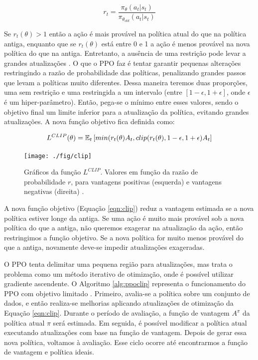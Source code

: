 \begin{equation}
\label{eqn:ratio}
r_{t} = \frac{\pi_{\theta}(a_{t}|s_{t})} {\pi_{\theta_{old}}(a_{t}|s_{t})} 
\end{equation}

Se $r_{t}(\theta) > 1$ então a ação é mais provável na política atual do que na política antiga, enquanto que se $r_{t}(\theta)$ está entre 0 e 1 a ação é menos provável na nova política do que na antiga. Entretanto, a ausência de uma restrição pode levar a grandes atualizações \cite{Schulman17}. O que o PPO faz é tentar garantir pequenas alterações restringindo a razão de probabilidade das políticas, penalizando grandes passos que levam a políticas muito diferentes. Dessa maneira teremos duas proporções, uma sem restrição e uma restringida a um intervalo (entre $[1-\epsilon, 1+\epsilon]$, onde $\epsilon$ é um hiper-parâmetro). Então, pega-se o mínimo entre esses valores, sendo o objetivo final um limite inferior para a atualização da política, evitando grandes atualizações. A nova função objetivo fica definida como:

\begin{equation}
\label{eqn:clip}
L^{CLIP}(\theta) = \operatorname{\mathbb{E}}_{t} \left[min(r_{t}(\theta)A_{ t}, clip(r_{t}(\theta), 1-\epsilon, 1+\epsilon)A_{t}\right]
\end{equation}

\begin{figure}[ht]
 \centering
  \texttt{[image: ./fig/clip]}
  \captionsetup{width=1\textwidth}
 \caption[Gráficos da função $L^{CLIP}$.]
 {Gráficos da função $L^{CLIP}$. Valores em função da razão de probabilidade $r$, para vantagens positivas (esquerda) e vantagens negativas (direita) \cite{Schulman17}.}
 \label{fig:ppoclip}
\end{figure}

A nova função objetivo (Equação \ref{eqn:clip}) reduz a vantagem estimada se a nova política estiver longe da antiga. Se uma ação é muito mais provável sob a nova política do que a antiga, não queremos exagerar na atualização da ação, então restringimos a função objetivo. Se a nova política for muito menos provável do que a antiga, novamente deve-se impedir atualizações exageradas.

O PPO tenta delimitar uma pequena região para atualizações, mas trata o problema como um método iterativo de otimização, onde é possível utilizar gradiente ascendente. O Algoritmo \ref{alg:ppoclip} representa o funcionamento do PPO com objetivo limitado \cite{Achiam}. Primeiro, avalia-se a política sobre um conjunto de dados, e então realiza-se melhorias aplicando atualizações de otimização da Equação \ref{eqn:clip}. Durante o período de avaliação, a função de vantagem $A^\pi$ da política atual $\pi$ será estimada. Em seguida, é possível modificar a política atual executando atualizações com base na função de vantagem. Depois de gerar essa nova política, voltamos à avaliação. Esse ciclo ocorre até encontrarmos a função de vantagem e política ideais.


